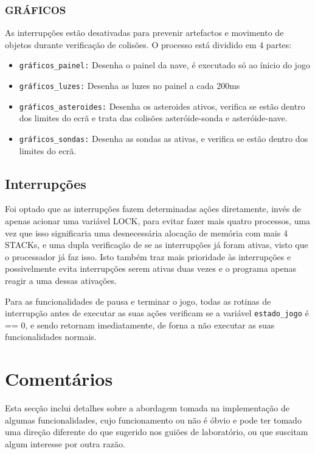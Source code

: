 \documentclass{article}
\begin{document}
\subsubsection{GRÁFICOS}

As interrupções estão desativadas para prevenir artefactos e movimento de objetos durante verificação de colisões. O processo está dividido em 4 partes:
\begin{itemize}
    \item \texttt{gráficos\_painel:} Desenha o painel da nave, é executado só ao ínicio do jogo 
    \item \texttt{gráficos\_luzes:} Desenha as luzes no painel a cada 200ms
    \item \texttt{gráficos\_asteroides:} Desenha os asteroides ativos, verifica se estão dentro dos limites do ecrã e trata das colisões asteróide-sonda e asteróide-nave.
    \item \texttt{gráficos\_sondas:} Desenha as sondas as ativas, e verifica se estão dentro dos limites do ecrã.
\end{itemize}

\subsection{Interrupções}

Foi optado que as interrupções fazem determinadas ações diretamente, invés de apenas acionar uma variável LOCK, para evitar fazer mais quatro processos, uma vez que isso significaria uma desnecessária alocação de memória com mais 4 STACKs, e uma dupla verificação de se as interrupções já foram ativas, visto que o processador já faz isso. Isto também traz mais prioridade às interrupções e possivelmente evita interrupções serem ativas duas vezes e o programa apenas reagir a uma dessas ativações.

\bigbreak

Para as funcionalidades de pausa e terminar o jogo, todas as rotinas de interrupção antes de executar as suas ações verificam se a variável \texttt{estado\_jogo} é == 0, e sendo retornam imediatamente, de forna a não executar as suas funcionalidades normais.

\section{Comentários}
Esta secção inclui detalhes sobre a abordagem tomada na implementação de algumas funcionalidades, cujo funcionamento ou não é óbvio e pode ter tomado uma direção diferente do que sugerido nos guiões de laboratório, ou que suscitam algum interesse por outra razão.
\end{document}

